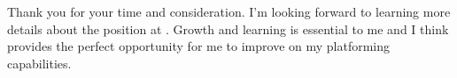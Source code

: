 


Thank you for your time and consideration. I'm looking forward to learning more details about the \position\;position at \company. Growth and learning is essential to me and I think \company provides the perfect opportunity for me to improve on my platforming capabilities. 
